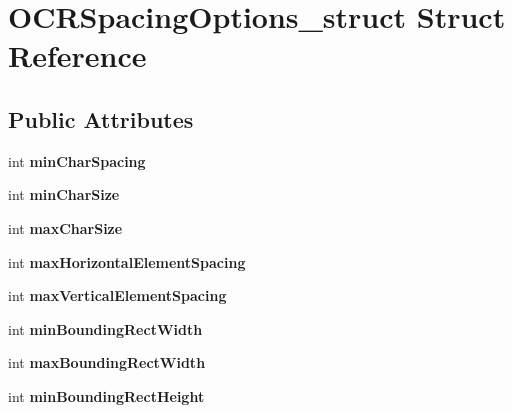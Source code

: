 \hypertarget{structOCRSpacingOptions__struct}{
\section{OCRSpacingOptions\_\-struct Struct Reference}
\label{structOCRSpacingOptions__struct}
}
\subsection*{Public Attributes}
\begin{DoxyCompactItemize}
\item 
\hypertarget{structOCRSpacingOptions__struct_acf21cffd3fdee7d2881e602622617395}{
int {\bfseries minCharSpacing}}
\label{structOCRSpacingOptions__struct_acf21cffd3fdee7d2881e602622617395}

\item 
\hypertarget{structOCRSpacingOptions__struct_aedbdc17d26d35768ed2a1bb02255c578}{
int {\bfseries minCharSize}}
\label{structOCRSpacingOptions__struct_aedbdc17d26d35768ed2a1bb02255c578}

\item 
\hypertarget{structOCRSpacingOptions__struct_a7e24ec27ffca7b8215eca0c9678a73b1}{
int {\bfseries maxCharSize}}
\label{structOCRSpacingOptions__struct_a7e24ec27ffca7b8215eca0c9678a73b1}

\item 
\hypertarget{structOCRSpacingOptions__struct_a13469fd9e045a628e7dcf46ec9c37df1}{
int {\bfseries maxHorizontalElementSpacing}}
\label{structOCRSpacingOptions__struct_a13469fd9e045a628e7dcf46ec9c37df1}

\item 
\hypertarget{structOCRSpacingOptions__struct_abab2f42296aa18603b453c36114053be}{
int {\bfseries maxVerticalElementSpacing}}
\label{structOCRSpacingOptions__struct_abab2f42296aa18603b453c36114053be}

\item 
\hypertarget{structOCRSpacingOptions__struct_a6c29b20e6c8c291a08a07db23a78cd8b}{
int {\bfseries minBoundingRectWidth}}
\label{structOCRSpacingOptions__struct_a6c29b20e6c8c291a08a07db23a78cd8b}

\item 
\hypertarget{structOCRSpacingOptions__struct_a0b99ac3f19a4f22eb3edeaa29adfefcf}{
int {\bfseries maxBoundingRectWidth}}
\label{structOCRSpacingOptions__struct_a0b99ac3f19a4f22eb3edeaa29adfefcf}

\item 
\hypertarget{structOCRSpacingOptions__struct_a6afd08cdaa7068d86eb299f61a95a5b2}{
int {\bfseries minBoundingRectHeight}}
\label{structOCRSpacingOptions__struct_a6afd08cdaa7068d86eb299f61a95a5b2}


\end{DoxyCompactItemize}
